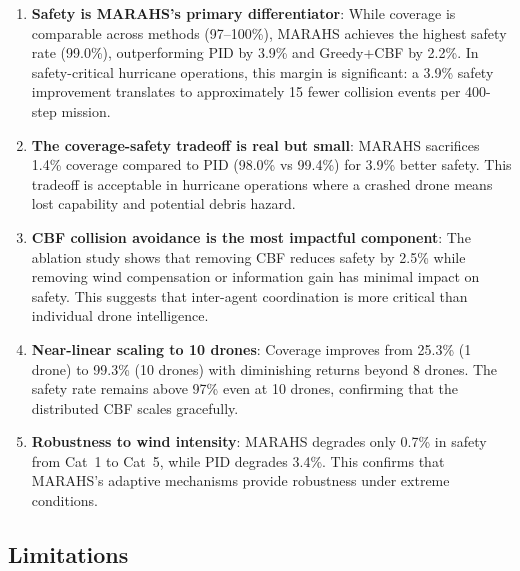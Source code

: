 \documentclass[11pt,twocolumn]{article}
\theoremstyle{definition}
\begin{document}
\begin{enumerate}[leftmargin=*]
    \item \textbf{Safety is MARAHS's primary differentiator}: While coverage is comparable across methods (97--100\%), MARAHS achieves the highest safety rate (99.0\%), outperforming PID by 3.9\% and Greedy+CBF by 2.2\%. In safety-critical hurricane operations, this margin is significant: a 3.9\% safety improvement translates to approximately 15 fewer collision events per 400-step mission.
    
    \item \textbf{The coverage-safety tradeoff is real but small}: MARAHS sacrifices 1.4\% coverage compared to PID (98.0\% vs 99.4\%) for 3.9\% better safety. This tradeoff is acceptable in hurricane operations where a crashed drone means lost capability and potential debris hazard.
    
    \item \textbf{CBF collision avoidance is the most impactful component}: The ablation study shows that removing CBF reduces safety by 2.5\% while removing wind compensation or information gain has minimal impact on safety. This suggests that inter-agent coordination is more critical than individual drone intelligence.
    
    \item \textbf{Near-linear scaling to 10 drones}: Coverage improves from 25.3\% (1 drone) to 99.3\% (10 drones) with diminishing returns beyond 8 drones. The safety rate remains above 97\% even at 10 drones, confirming that the distributed CBF scales gracefully.
    
    \item \textbf{Robustness to wind intensity}: MARAHS degrades only 0.7\% in safety from Cat~1 to Cat~5, while PID degrades 3.4\%. This confirms that MARAHS's adaptive mechanisms provide robustness under extreme conditions.
\end{enumerate}

\subsection{Limitations}
\end{document}

